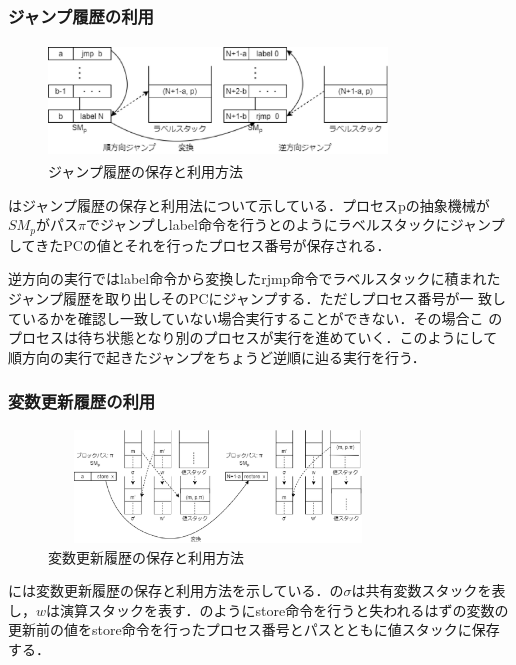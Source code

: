 \documentclass[submit,PRO]{ipsj}
\begin{document}
\subsubsection{ジャンプ履歴の利用}

\begin{figure}[tb]
\includegraphics[height=3.0cm,width=9.0cm]{jmp.eps}
\caption{ジャンプ履歴の保存と利用方法}
\label{fig:jmp}
\end{figure}

はジャンプ履歴の保存と利用法について示している．プロセスpの抽象機械が$SM_p$がパス$\pi$でジャンプしlabel命令を行うとのようにラベルスタックにジャンプしてきたPCの値とそれを行ったプロセス番号が保存される．

逆方向の実行ではlabel命令から変換したrjmp命令でラベルスタックに積まれた
ジャンプ履歴を取り出しそのPCにジャンプする．ただしプロセス番号が一
致しているかを確認し一致していない場合実行することができない．その場合こ
のプロセスは待ち状態となり別のプロセスが実行を進めていく．このようにして
順方向の実行で起きたジャンプをちょうど逆順に辿る実行を行う．

\subsubsection{変数更新履歴の利用}

\begin{figure}[tb]
\includegraphics[height=3.0cm,width=9.0cm]{store.eps}
\caption{変数更新履歴の保存と利用方法}
\label{fig:store}
\end{figure}

には変数更新履歴の保存と利用方法を示している．の$\sigma$は共有変数スタックを表し，$w$は演算スタックを表す．のようにstore命令を行うと失われるはずの変数の更新前の値をstore命令を行ったプロセス番号とパスとともに値スタックに保存する．
\end{document}
